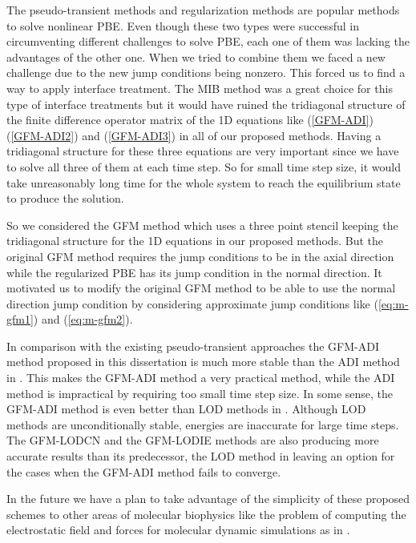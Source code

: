 
The pseudo-transient methods and regularization methods are popular methods to solve nonlinear PBE. Even though these two types were successful in circumventing different challenges to solve PBE, each one of them was lacking the advantages of the other one. When we tried to combine them we faced a new challenge due to  the new jump conditions being nonzero. This forced us to find a way to apply interface treatment. The MIB method \cite{Geng2007,Chen2011,Yu2007,ZHAO2004,ZHOU2006,ZHOU2006_high,YU2007_3D} was a great choice for this type of interface treatments but it would have ruined the tridiagonal structure of the finite difference operator matrix of the 1D equations like (\ref{GFM-ADI}) (\ref{GFM-ADI2}) and (\ref{GFM-ADI3}) in all of our proposed methods. Having a tridiagonal structure for these three equations are very important since we have to solve all three of them at each time step. So for small time step size, it would take unreasonably long time for the whole system to reach the equilibrium state to produce the solution.   

So we considered the GFM method \cite{Liu2000} which uses a three point stencil keeping the tridiagonal structure for the 1D equations in our proposed methods. But the original GFM method requires the jump conditions to be in the axial direction while the regularized PBE has its jump condition in the normal direction. It motivated us to modify the original GFM method to be able to use the normal direction jump condition by considering approximate jump conditions like (\ref{eq:m-gfm1}) and (\ref{eq:m-gfm2}). 

In comparison with the existing pseudo-transient approaches the GFM-ADI method proposed in this dissertation is much more stable than the ADI method in \cite{Geng2013_Fully}. This makes the GFM-ADI method a very practical method, while the ADI method is impractical by requiring too small time step size. In some sense, the GFM-ADI method is even better than LOD methods in \cite{Wilson2016}. Although LOD methods are unconditionally stable, energies are inaccurate for large time steps. The GFM-LODCN and the GFM-LODIE methods are also producing more accurate results than its predecessor, the LOD method in \cite{Wilson2016} leaving an option for the cases when the GFM-ADI method fails to converge. 

In the future we have a plan to take advantage of the simplicity of these proposed schemes to other areas of molecular biophysics like the problem of computing the electrostatic field and forces for molecular dynamic simulations as in \cite{GENG_WEI2011}. 
 